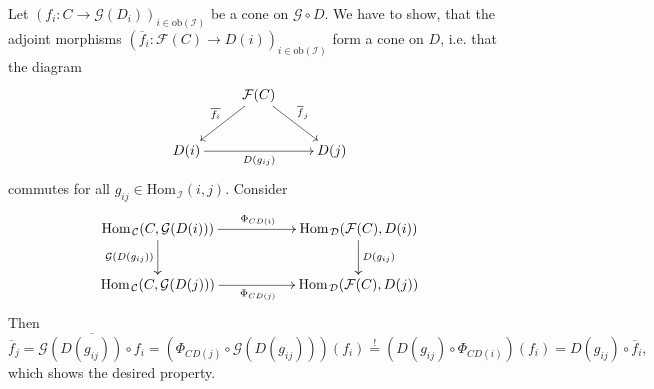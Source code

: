 \documentclass[11pt]{book}
\numberwithin{dummy}{section}
\theoremstyle{nonumberbreak}
\newenvironment{sol}[1][]{\ifthenelse{\equal{#1}{}}{\solution}{\solution[#1]}\rm}{\endsolution}
\newenvironment{prob}[1][]{\ifthenelse{\equal{#1}{}}{\problem}{\problem[#1]}\rm}{\endproblem}
\newcommand{\Hom}{\mathrm{Hom}\hspace{1pt}}
\newcommand{\C}{\mathcal{C}}
\newcommand{\D}{\mathcal{D}}
\newcommand{\F}{\mathcal{F}}
\newcommand{\G}{\mathcal{G}}
\newcommand{\I}{\mathcal{I}}
\newcommand{\la}{\longrightarrow}
\begin{document}
\begin{spacing}{1.4}
\begin{prob}
\begin{sol}
\begin{compactenum}
\item Let $\left(f_i: C \la \G(D_i)\right)_{i \in \mathrm{ob}(\I)}$ be a cone on $\G \circ D$. We have to show, that the adjoint morphisms $\left(\overline{f}_i: \F(C) \la D(i)\right)_{i \in \mathrm{ob}(\I)}$ form a cone on $D$, i.e. that the diagram
$$
\begin{xy}
\xymatrix{
& \F(C) \ar[rd]^{\overline{f}_j} \ar[ld]_{\overline{f_i}} & \\ D(i) \ar[rr]_{D(g_{ij})} && D(j) }
\end{xy}
$$
commutes for all $g_{ij} \in \Hom_{\I}(i,j)$. Consider 
$$
\begin{xy}
\xymatrix{
\Hom_{\C}(C, \G(D(i))) \ar[d]_{\G(D(g_{ij}))} \ar[rr]^{\Phi_{CD(i)}} && \Hom_{\D}(\F(C), D(i)) \ar[d]^{D(g_{ij})} \\ \Hom_{\C}(C, \G(D(j))) \ar[rr]_{\Phi_{CD(j)}} && \Hom_{\D}(\F(C), D(j))
}
\end{xy}
$$
Then 
$$\overline{f}_j = \overline{\G(D(g_{ij})) \circ f_i} = \left( \Phi_{CD(j)} \circ \G(D(g_{ij}))\right)(f_i) \overset{!}{=} \left( D(g_{ij}) \circ \Phi_{CD(i)}\right)(f_i) = D(g_{ij}) \circ \overline{f}_i,$$
which shows the desired property.


\end{compactenum}
\end{sol}
\end{prob}
\end{spacing}
\end{document}
